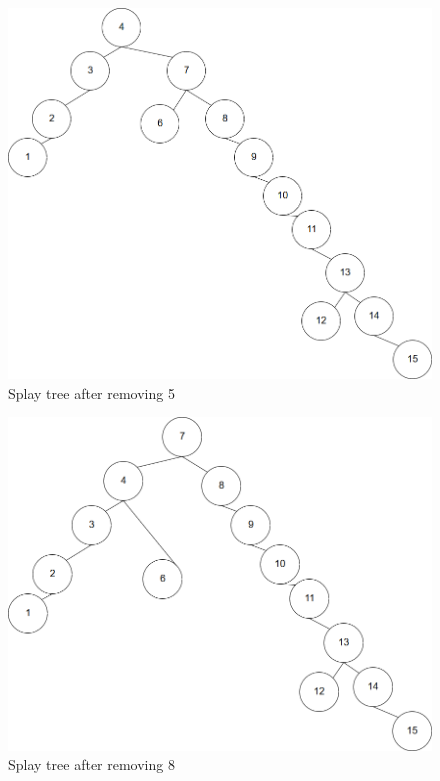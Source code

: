 \documentclass{article}
\begin{document}
\begin{enumerate}
    
    \begin{figure}[H]
 	  \centering
 	  \caption{Splay tree after removing 5}
 	  \label{Trees:SplayR1}
	  \includegraphics[width=\textwidth]{SplayR1}
    \end{figure}
    \begin{figure}[H]
 	  \centering
 	  \caption{Splay tree after removing 8}
 	  \label{Trees:SplayR2}
	  \includegraphics[width=\textwidth]{SplayR2}
    \end{figure}
    \begin{figure}[H]

\end{figure}
\end{enumerate}
\end{document}
